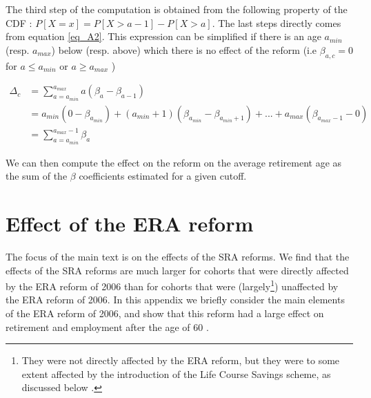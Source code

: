 \documentclass[12pt,a4paper]{article}
\begin{document}
The third step of the computation is obtained from the following property of the CDF : $P[X =  x] = P[X > a-1] - P[X > a] $. The last steps directly comes from equation \ref{eq_A2}. This expression can be simplified if there is an age $a_{min}$ (resp. $a_{max}$) below (resp. above) which there is no effect of the reform (i.e $\beta_{a,c} = 0 $ for $a \leq a_{min}$ or $a \geq a_{max}$  )

\begin{align*}
	\Delta_c & = \sum_{a = a_{min}}^{a_{max}} a ( \beta_{a} - \beta_{a-1}) \\
	& = a_{min}  (0 - \beta_{a_{min}}) + (a_{min}+1)  (\beta_{a_{min}} - \beta_{a_{min}+1} ) + ...  + a_{max}  (\beta_{a_{max}-1} - 0 ) \\
	&  = \sum_{a = a_{min}}^{a_{max}-1}  \beta_{a} 
\end{align*}

We can then compute the effect on the reform on the average retirement age as the sum of the $\beta$ coefficients estimated for a given cutoff. 

\clearpage


\section{Effect of the ERA reform}\label{appendix_era}

\setcounter{table}{0}
\setcounter{equation}{0}
\setcounter{figure}{0}
\renewcommand{\thefigure}{B.\arabic{figure}}
\renewcommand{\thetable}{B.\arabic{table}}
\renewcommand{\theequation}{B.\arabic{equation}}

The focus of the main text is on the effects of the SRA reforms. We find that the effects of the SRA reforms are much larger for cohorts that were directly affected by the ERA reform of 2006 than for cohorts that were (largely\footnote{They were not directly affected by the ERA reform, but they were to some extent affected by the introduction of the Life Course Savings scheme, as discussed below \citep[also see][]{lindeboom_montizaan_2020}.}) unaffected by the ERA reform of 2006. In this appendix we briefly consider the main elements of the ERA reform of 2006, and show that this reform had a large effect on retirement and employment after the age of 60 \citep[for earlier analyses of this reform see e.g.][]{de_grip_et_al_2012, lindeboom_montizaan_2020}. 
\end{document}
